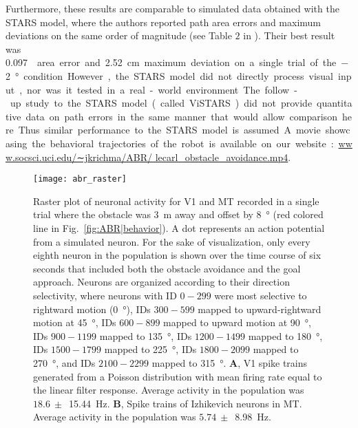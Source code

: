 Furthermore, these results are comparable to simulated data
obtained with the STARS model, where the authors reported
path area errors and maximum deviations on the same order of
magnitude (see Table $2$ in \cite{Elder2009}). Their best result
was \SI{0.097}{\meter\square} area error and \SI{2.52}{\centi\meter}
maximum deviation on a single trial of the \SI{-2}{\degree} condition.
However, the STARS model did
not directly process visual input, nor was it tested in a real-world
environment. The follow-up study to the STARS model (called
ViSTARS) did not provide quantitative data on path errors in the
same manner that would allow comparison here. Thus similar
performance to the STARS model is assumed.

A movie showcasing the behavioral trajectories of the robot
is available on our website: \url{www.socsci.uci.edu/∼jkrichma/ABR/
lecarl_obstacle_avoidance.mp4}.

\begin{figure}[t]
  \centering
  \texttt{[image: abr\_raster]}
  \caption{
  Raster plot of neuronal activity for \ac{V1} and \ac{MT} 
  recorded in a single trial where the obstacle 
  was \SI{3}{\meter} away and offset by \SI{8}{\degree} 
  (red colored line in Fig.~\ref{fig:ABR|behavior}).
  A dot represents an action potential from a simulated neuron. 
  For the sake of visualization, only every eighth neuron in the
  population is shown over the time course of six seconds that 
  included both the obstacle avoidance and the goal approach. 
  Neurons are organized according to their direction selectivity, 
  where neurons with ID $0-299$ were most selective to rightward motion
  (\SI{0}{\degree}), IDs $300-599$ mapped to upward-rightward motion 
  at \SI{45}{\degree}, IDs $600-899$ mapped to upward motion at 
  \SI{90}{\degree}, IDs $900-1199$ mapped to \SI{135}{\degree}, 
  IDs $1200-1499$ mapped to \SI{180}{\degree}, IDs $1500-1799$ 
  mapped to \SI{225}{\degree}, IDs $1800-2099$ mapped to 
  \SI{270}{\degree}, and IDs $2100-2299$ mapped to \SI{315}{\degree}. 
  $\mathbf{A}$, \ac{V1} spike trains generated from a Poisson distribution
  with mean firing rate equal to the linear filter response. 
  Average activity in the population was $18.6~\pm$~\SI{15.44}{\hertz}. 
  $\mathbf{B}$, Spike trains of Izhikevich neurons in \ac{MT}. 
  Average activity in the population was $5.74~\pm$~\SI{8.98}{\hertz}.}
  \label{fig:ABR|raster}
\end{figure}


